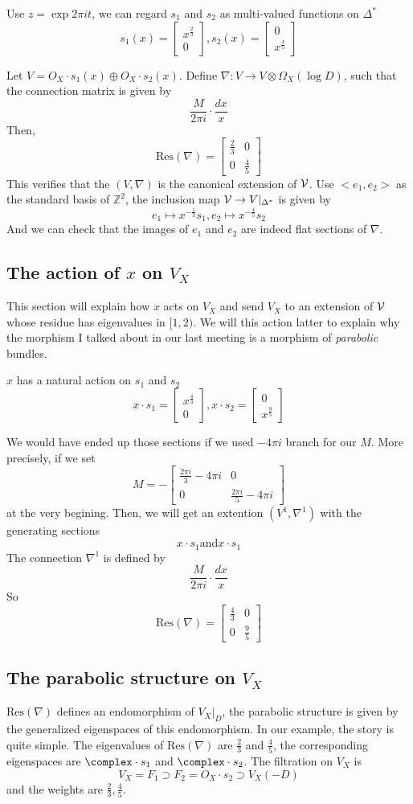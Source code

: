 \documentclass{article}
\renewcommand{\vector}[2]{
\left[\begin{array}{c}
    {#1} \\
    {#2}
    \end{array}\right]
}
\renewcommand{\matrix}[4]{
\left[\begin{array}{cc}
    {#1} & {#2} \\
    {#3} & {#4}
    \end{array}\right]
}
\begin{document}
Use $z = \exp{2\pi it}$, we can regard $s_1$ and $s_2$ as multi-valued functions on $\Delta^*$
\[
    s_1(x) = \vector{x^{\frac{2}{3}}}{0},
    s_2(x) = \vector{0}{x^{\frac{4}{5}}}
\]


Let $V = O_X\cdot s_1(x)\oplus O_X\cdot s_2(x)$.
Define $\nabla : V \rightarrow V\otimes\Omega_X(\log D)$, such that the connection matrix
is given by
\[
    \frac{M}{2\pi i}\cdot\frac{dx}{x}
\]
Then,
\[
    \text{Res}(\nabla) = \left[\begin{array}{cc}
                            \frac{2}{3} & 0 \\
                            0 & \frac{4}{5}
                            \end{array}\right]
\]
This verifies that the $(V, \nabla)$ is the canonical extension of $\mathcal{V}$.
Use $<e_1, e_2>$ as the standard basis of $\mathbb{Z}^2$, the inclusion map
$\mathcal{V} \rightarrow V|_{\Delta^*}$ is given by
\[
    e_1 \mapsto x^{-\frac{1}{3}}s_1, e_2 \mapsto x^{-\frac{4}{5}}s_2
\]
And we can check that the images of $e_1$ and $e_2$ are indeed flat sections of $\nabla$.


\subsection{The action of $x$ on $V_X$}
This section will explain how $x$ acts on $V_X$ and send $V_X$ to an extension of $\mathcal{V}$ whose
residue has eigenvalues in $[1, 2)$. We will this action latter to explain why the morphism
I talked about in our last meeting is a morphism of \emph{parabolic} bundles.

$x$ has a natural action on $s_1$ and $s_2$
\[
    x\cdot s_1 = \vector{x^{\frac{4}{3}}}{0},
    x\cdot s_2 = \vector{0}{x^{\frac{9}{5}}}
\]

We would have ended up those sections if we used $-4\pi i$ branch for our $M$. More precisely,
if we set 
\[
    M = - \matrix{\frac{2\pi i}{3} - 4\pi i}{0}{0}{\frac{2\pi i}{5} - 4\pi i}
\]
at the very begining. Then, we will get an extention $(V^1, \nabla^1)$ with the generating 
sections
\[
    x\cdot s_1 \text{and} x\cdot s_1
\]
The connection $\nabla^1$ is defined by
\[
    \frac{M}{2\pi i}\cdot\frac{dx}{x}
\]
So
\[
    \text{Res}(\nabla) = \matrix{\frac{4}{3}}{0}{0}{\frac{9}{5}}
\]

\subsection{The parabolic structure on $V_X$}
$\text{Res}(\nabla)$ defines an endomorphism of $V_X|_D$, the parabolic structure is given
by the generalized eigenspaces of this endomorphism. In our example, the story is quite 
simple. The eigenvalues of $\text{Res}(\nabla)$ are $\frac{2}{3}$ and $\frac{4}{5}$, 
the corresponding eigenspaces are $\complex\cdot s_1$ and $\complex\cdot s_2$. 
The filtration on $V_X$ is
\[
    V_X = F_1 \supset F_2 = O_X\cdot s_2 \supset V_X(-D)
\]
and the weights are $\frac{2}{3}, \frac{4}{5}$. 
\end{document}
